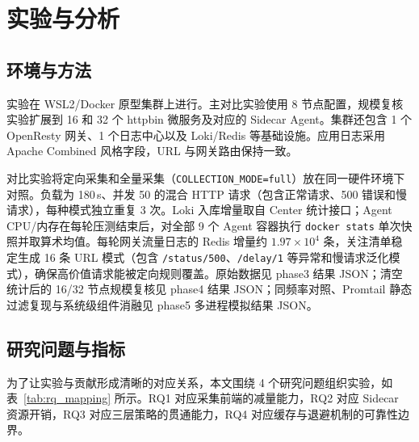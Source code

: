 \section{实验与分析}

\subsection{环境与方法}
实验在 WSL2/Docker 原型集群上进行。主对比实验使用 8 节点配置，规模复核实验扩展到 16 和 32 个 httpbin 微服务及对应的 Sidecar Agent。集群还包含 1 个 OpenResty 网关、1 个日志中心以及 Loki/Redis 等基础设施。应用日志采用 Apache Combined 风格字段，URL 与网关路由保持一致。

对比实验将定向采集和全量采集（\texttt{COLLECTION\_MODE=full}）放在同一硬件环境下对照。负载为 180\,s、并发 50 的混合 HTTP 请求（包含正常请求、500 错误和慢请求），每种模式独立重复 3 次。Loki 入库增量取自 Center 统计接口；Agent CPU/内存在每轮压测结束后，对全部 9 个 Agent 容器执行 \texttt{docker stats} 单次快照并取算术均值。每轮网关流量日志的 Redis 增量约 $1.97\times10^4$ 条，关注清单稳定生成 16 条 URL 模式（包含 \texttt{/status/500}、\texttt{/delay/1} 等异常和慢请求泛化模式），确保高价值请求能被定向规则覆盖。原始数据见 phase3 结果 JSON；清空统计后的 16/32 节点规模复核见 phase4 结果 JSON；同频率对照、Promtail 静态过滤复现与系统级组件消融见 phase5 多进程模拟结果 JSON。

\subsection{研究问题与指标}
为了让实验与贡献形成清晰的对应关系，本文围绕 4 个研究问题组织实验，如表~\ref{tab:rq_mapping} 所示。RQ1 对应采集前端的减量能力，RQ2 对应 Sidecar 资源开销，RQ3 对应三层策略的贯通能力，RQ4 对应缓存与退避机制的可靠性边界。

\begin{table}[htbp]
  \centering
  \caption{研究问题、指标与证据映射}
  \label{tab:rq_mapping}
  \small
\end{table}

